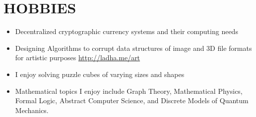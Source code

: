 \documentclass[11pt]{article} %
\begin{document}
\section*{HOBBIES}
\begin{itemize}
  \setlength{\itemsep}{1pt}
  \setlength{\parskip}{0pt}
  \setlength{\parsep}{0pt}
\item Decentralized cryptographic currency systems and their computing needs
\item Designing Algorithms to corrupt data structures of image and 3D file formats for artistic purposes \url{http://ladha.me/art}
\item I enjoy solving puzzle cubes of varying sizes and shapes
\item Mathematical topics I enjoy include Graph Theory, Mathematical Physics, Formal Logic, Abstract Computer Science, and Discrete Models of Quantum Mechanics.
\end{itemize}
\end{document}
